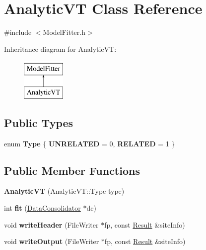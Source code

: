 \hypertarget{classAnalyticVT}{\section{Analytic\-V\-T Class Reference}
\label{classAnalyticVT}
}


{\ttfamily \#include $<$Model\-Fitter.\-h$>$}

Inheritance diagram for Analytic\-V\-T\-:\begin{figure}[H]
\begin{center}
\leavevmode
\includegraphics[height=2.000000cm]{classAnalyticVT}
\end{center}
\end{figure}
\subsection*{Public Types}
\begin{DoxyCompactItemize}
\item 
enum {\bfseries Type} \{ {\bfseries U\-N\-R\-E\-L\-A\-T\-E\-D} =  0, 
{\bfseries R\-E\-L\-A\-T\-E\-D} =  1
 \}
\end{DoxyCompactItemize}
\subsection*{Public Member Functions}
\begin{DoxyCompactItemize}
\item 
\hypertarget{classAnalyticVT_a017217a91030156c4f172d52913403f1}{{\bfseries Analytic\-V\-T} (Analytic\-V\-T\-::\-Type type)}\label{classAnalyticVT_a017217a91030156c4f172d52913403f1}

\item 
\hypertarget{classAnalyticVT_aaadf02d4c38d989c699efdef6ed35525}{int {\bfseries fit} (\hyperlink{classDataConsolidator}{Data\-Consolidator} $\ast$dc)}\label{classAnalyticVT_aaadf02d4c38d989c699efdef6ed35525}

\item 
\hypertarget{classAnalyticVT_a6c158d2a3fe417152bb96a8669be8f08}{void {\bfseries write\-Header} (File\-Writer $\ast$fp, const \hyperlink{classResult}{Result} \&site\-Info)}\label{classAnalyticVT_a6c158d2a3fe417152bb96a8669be8f08}

\item 
\hypertarget{classAnalyticVT_ab4be8f6330d5aa086bb1df11ed0f17a6}{void {\bfseries write\-Output} (File\-Writer $\ast$fp, const \hyperlink{classResult}{Result} \&site\-Info)}\label{classAnalyticVT_ab4be8f6330d5aa086bb1df11ed0f17a6}

\end{DoxyCompactItemize}
